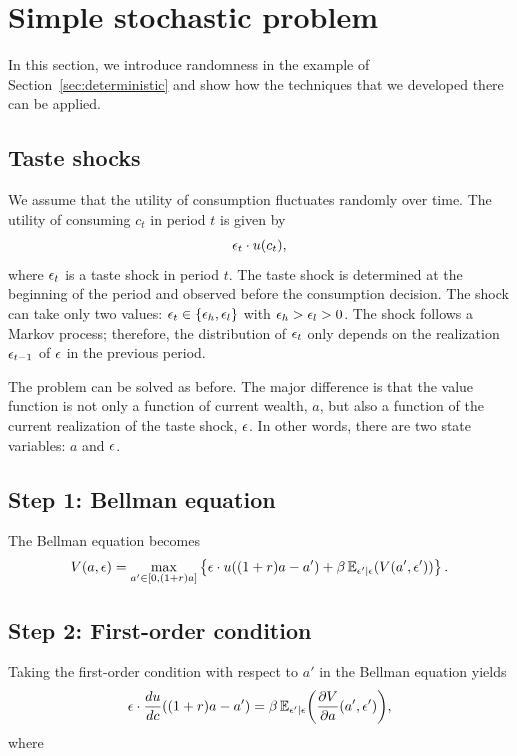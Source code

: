 \documentclass[letterpaper, 11pt, leqno]{article}
\begin{document}
\section{Simple stochastic problem}\label{sec:stochastic}

In this section, we introduce randomness in the example of Section~\ref{sec:deterministic} and show how the techniques that we developed there can be applied.

\subsection{Taste shocks}

We assume that the utility of consumption fluctuates randomly over time. The utility of consuming $c_{t}$ in period $t$ is given by
\begin{equation*}
\epsilon_t \cdot u(c_t),
\end{equation*}
where $\epsilon_t$ is a taste shock in period $t$. The taste shock is determined at the beginning of the period and observed before the consumption decision. The shock can take only two values: $\epsilon_{t}\in\left\lbrace \epsilon_h,\epsilon_l \right\rbrace$ with $\epsilon_h>\epsilon_l>0$. The shock follows a Markov process; therefore, the distribution of $\epsilon_t$ only depends on the realization $\epsilon_{t-1}$ of $\epsilon$ in the previous period. 

The problem can be solved as before. The major difference is that the value function is not only a function of current wealth, $a$, but also a function of the current realization of the taste shock, $\epsilon$. In other words, there are two state variables: $a$ and $\epsilon$.

\subsection{Step 1: Bellman equation}

The Bellman equation becomes
\begin{equation*}
V(a,\e)=\max_{a'\in[0,(1+r) a]} \bc{\e \cdot u((1+r) a-a')+\b \E[\e'\mid \e]{V(a',\e')}}.
\end{equation*}
\subsection{Step 2: First-order condition}
Taking the first-order condition with respect to $a'$ in the Bellman equation yields
\begin{equation}
\e \cdot \od{u}{c}((1+r) a-a')=\b \E[\e'\mid \e]{\pd{V}{a}(a',\e')},\label{e:foc0}
\end{equation}
where 
\end{document}

